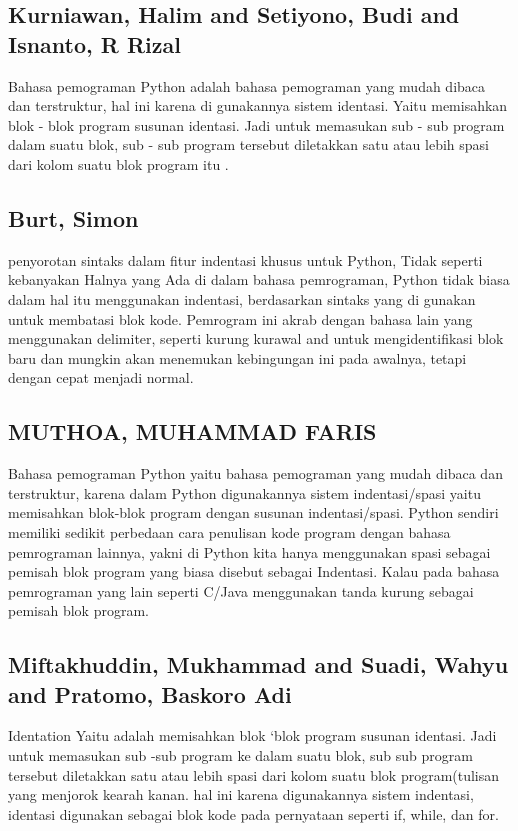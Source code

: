 \documentclass[12pt]{article}
\begin{document}
\subsection{Kurniawan, Halim and Setiyono, Budi and Isnanto, R Rizal}
Bahasa pemograman Python adalah bahasa pemograman yang mudah dibaca dan terstruktur, hal ini karena di gunakannya sistem identasi. Yaitu memisahkan blok - blok program susunan identasi. Jadi untuk memasukan sub - sub program dalam suatu blok, sub - sub program tersebut diletakkan satu atau lebih spasi dari kolom suatu blok program itu \cite{kurniawan2011aplikasi}.

\subsection{Burt, Simon}
penyorotan sintaks dalam fitur indentasi khusus untuk Python, Tidak seperti kebanyakan Halnya yang Ada di dalam bahasa pemrograman, Python tidak biasa dalam hal itu menggunakan indentasi, berdasarkan sintaks yang di gunakan untuk membatasi blok kode. Pemrogram ini akrab dengan bahasa lain yang menggunakan delimiter, seperti kurung kurawal {and} untuk mengidentifikasi blok baru dan mungkin akan menemukan kebingungan ini pada awalnya, tetapi dengan cepat menjadi normal\cite{burtusing}.

\subsection{MUTHOA, MUHAMMAD FARIS}
Bahasa pemograman Python yaitu bahasa pemograman yang mudah dibaca dan terstruktur, karena dalam Python digunakannya sistem indentasi/spasi yaitu memisahkan blok-blok program dengan susunan indentasi/spasi. Python sendiri memiliki sedikit perbedaan cara penulisan kode program dengan bahasa pemrograman lainnya, yakni di Python kita hanya menggunakan spasi sebagai pemisah blok program yang biasa disebut sebagai Indentasi. Kalau pada bahasa pemrograman yang lain seperti C/Java menggunakan tanda kurung sebagai pemisah blok program\cite{muthoa2017sistem}.

\subsection{Miftakhuddin, Mukhammad and Suadi, Wahyu and Pratomo, Baskoro Adi}
Identation Yaitu adalah memisahkan blok `blok program susunan identasi. Jadi untuk memasukan sub -sub program ke dalam suatu blok, sub sub program tersebut diletakkan satu atau lebih spasi dari kolom suatu blok program(tulisan yang menjorok kearah kanan. hal ini karena digunakannya sistem indentasi, identasi digunakan sebagai blok kode pada pernyataan seperti if, while, dan for\cite{miftakhuddinimplementasi}. 
\end{document}
